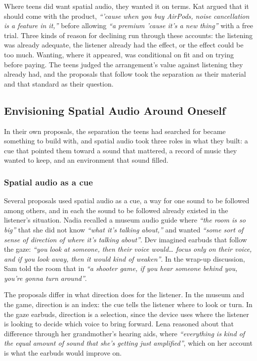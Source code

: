 Where teens did want spatial audio, they wanted it on terms. Kat argued that it should come with the product, \textit{``'cause when you buy AirPods, noise cancellation is a feature in it,''} before allowing \textit{``a premium 'cause it's a new thing''} with a free trial. Three kinds of reason for declining run through these accounts: the listening was already adequate, the listener already had the effect, or the effect could be too much. Wanting, where it appeared, was conditional on fit and on trying before paying. The teens judged the arrangement's value against listening they already had, and the proposals that follow took the separation as their material and that standard as their question.

\subsection{Envisioning Spatial Audio Around Oneself}
\label{sec:4.2}

In their own proposals, the separation the teens had searched for became something to build with, and spatial audio took three roles in what they built: a cue that pointed them toward a sound that mattered, a record of music they wanted to keep, and an environment that sound filled.

\subsubsection{Spatial audio as a cue}

Several proposals used spatial audio as a cue, a way for one sound to be followed among others, and in each the sound to be followed already existed in the listener's situation. Nadia recalled a museum audio guide where \textit{``the room is so big''} that she did not know \textit{``what it's talking about,''} and wanted \textit{``some sort of sense of direction of where it's talking about''}. Dev imagined earbuds that follow the gaze: \textit{``you look at someone, then their voice would\ldots{} focus only on their voice, and if you look away, then it would kind of weaken''}. In the wrap-up discussion, Sam told the room that in \textit{``a shooter game, if you hear someone behind you, you're gonna turn around''}.

The proposals differ in what direction does for the listener. In the museum and the game, direction is an index: the cue tells the listener where to look or turn. In the gaze earbuds, direction is a selection, since the device uses where the listener is looking to decide which voice to bring forward. Lena reasoned about that difference through her grandmother's hearing aids, where \textit{``everything is kind of the equal amount of sound that she's getting just amplified''}, which on her account is what the earbuds would improve on.

